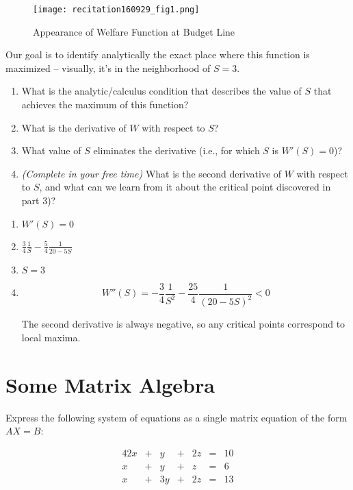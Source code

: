 \documentclass{article}
\newenvironment{solution}{\color{red}}{\color{black}}
\begin{document}
\begin{figure}[htbp]
\centering
\texttt{[image: recitation160929\_fig1.png]}
\caption{Appearance of Welfare Function at Budget Line}
\label{fig:welfare}
\end{figure}

Our goal is to identify analytically the exact place where this function is maximized -- visually, it's in the neighborhood of $S = 3$.

\begin{enumerate}
\item What is the analytic/calculus condition that describes the value of $S$ that achieves the maximum of this function?
\item What is the derivative of $W$ with respect to $S$?
\item What value of $S$ eliminates the derivative (i.e., for which $S$ is $W'(S) = 0$)?
\item \textit{(Complete in your free time)} What is the second derivative of $W$ with respect to $S$, and what can we learn from it about the critical point discovered in part 3)? 
\end{enumerate}

\begin{solution}
\begin{enumerate}
\item $W'(S) = 0$
\item $\frac34 \frac1{S} -\frac54 \frac1{20 - 5S}$
\item $S = 3$
\item 

\[ W''(S) = -\frac34 \frac1{S^2} - \frac{25}4 \frac1{\left( 20 - 5S \right)^2} < 0 \]

The second derivative is always negative, so any critical points correspond to local maxima.
\end{enumerate}
\end{solution}

\section*{Some Matrix Algebra}

Express the following system of equations as a single matrix equation of the form $AX = B$:

\begin{alignat*}{4}
2x & {}+{} &  y & {}+{} & 2z & {}={} & 10 \\
 x & {}+{} &  y & {}+{} &  z & {}={} &  6 \\
 x & {}+{} & 3y & {}+{} & 2z & {}={} & 13
\end{alignat*}
\end{document}
